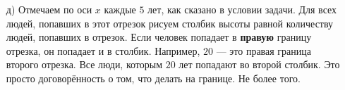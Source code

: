 \documentclass[12pt, a4paper, oneside]{article}
\begin{document}
{\begin{enumerate}
\begin{itemize}
		При этом $95 \%$ выборки находится между $\bar x - 2 \cdot \hat \sigma$ и $\bar x + 2 \cdot \hat \sigma$, а $99.9\%$ выборки находятся между $\bar x - 3 \cdot \hat \sigma$ и $\bar x + 3 \cdot \hat \sigma$. 
		
		Правила таких кучкований называют правилом одной, двух и трёх сигм. Их часто используют для проведения АБ-тестов. Об этом мы поговорим ближе к концу курса. Попомните моё слово. 
	\end{itemize}
	
	
	\item[д)] Отмечаем по оси $x$ каждые $5$  лет, как сказано в условии задачи. Для всех людей, попавших в этот отрезок рисуем столбик высоты равной количеству людей, попавших в отрезок. Если человек попадает в \textbf{правую} границу отрезка, он попадает и в столбик. Например, $20$ --- это правая граница второго отрезка. Все люди, которым $20$ лет попадают во второй столбик. Это просто договорённость о том, что делать на границе. Не более того. 
	

\end{enumerate}}
\end{document}
